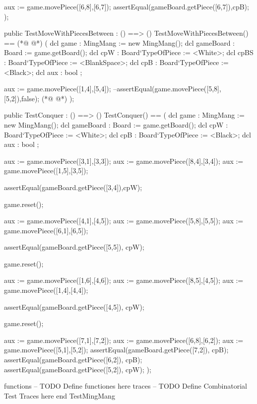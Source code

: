 \begin{vdmpp}[breaklines=true]
  aux := game.movePiece([6,8],[6,7]);
  assertEqual(gameBoard.getPiece([6,7]),cpB);
 );
 
 public TestMoveWithPiecesBetween : () ==> ()
 TestMoveWithPiecesBetween() ==
(*@
\label{TestCanConquer:79}
@*)
 (
  dcl game : MingMang := new MingMang(); 
  dcl gameBoard : Board := game.getBoard();
  dcl cpW : Board`TypeOfPiece := <White>;
  dcl cpBS : Board`TypeOfPiece := <BlankSpace>;
  dcl cpB : Board`TypeOfPiece := <Black>;
  dcl aux : bool ;
  
  aux := game.movePiece([1,4],[5,4]);
  --assertEqual(game.movePiece([5,8],[5,2]),false);
(*@
\label{TestConquer:89}
@*)
 );
 
 
 public TestConquer : () ==> ()
 TestConquer() ==
 (
  dcl game : MingMang := new MingMang(); 
  dcl gameBoard : Board := game.getBoard();
  dcl cpW : Board`TypeOfPiece := <White>;
  dcl cpB : Board`TypeOfPiece := <Black>;
  dcl aux : bool ;
  
  
  aux := game.movePiece([3,1],[3,3]);
  aux := game.movePiece([8,4],[3,4]);
  aux := game.movePiece([1,5],[3,5]);
 
  assertEqual(gameBoard.getPiece([3,4]),cpW);
  
  game.reset();
  
  aux := game.movePiece([4,1],[4,5]);
  aux := game.movePiece([5,8],[5,5]);
  aux := game.movePiece([6,1],[6,5]);
  
  assertEqual(gameBoard.getPiece([5,5]), cpW);
  
  game.reset();
  
  aux := game.movePiece([1,6],[4,6]);
  aux := game.movePiece([8,5],[4,5]);
  aux := game.movePiece([1,4],[4,4]);
    
  assertEqual(gameBoard.getPiece([4,5]), cpW);
  
  game.reset();
  
  aux := game.movePiece([7,1],[7,2]);
  aux := game.movePiece([6,8],[6,2]);
  aux := game.movePiece([5,1],[5,2]);  
  assertEqual(gameBoard.getPiece([7,2]), cpB); 
  assertEqual(gameBoard.getPiece([6,2]), cpB); 
  assertEqual(gameBoard.getPiece([5,2]), cpW);  
 );
 
functions
-- TODO Define functiones here
traces
-- TODO Define Combinatorial Test Traces here
end TestMingMang
\end{vdmpp}
\bigskip
